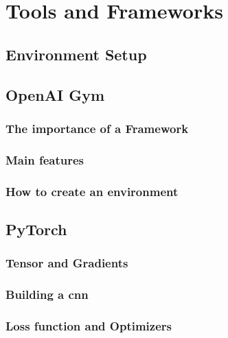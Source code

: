 \chapter{Tools and Frameworks}

\lipsum[10]

\section{Environment Setup}

\lipsum[10]

\section{OpenAI Gym}

\lipsum[10]

\subsection{The importance of a Framework}

\lipsum[10]

\subsection{Main features}

\lipsum[10]

\subsection{How to create an environment}

\lipsum[10]

\section{PyTorch}

\lipsum[10]

\subsection{Tensor and Gradients}

\lipsum[10]

\subsection{Building a \acrshort{cnn}}

\lipsum[10]

\subsection{Loss function and Optimizers}

